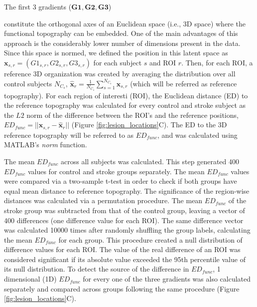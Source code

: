\documentclass[fleqn,10pt]{wlscirep}
\begin{document}
The first 3 gradients ($\textbf{G1},\textbf{G2},\textbf{G3}$) 
constitute the orthogonal axes of an Euclidean space (i.e., 3D space) where the functional topography can be embedded. One of the main advantages of this approach is the considerably lower number of dimensions present in the data. Since this space is normed, we defined the position in this latent space as $\textbf{x}_{s,r}=(G1_{s,r},G2_{s,r},G3_{s,r})$ for each subject $s$ and ROI $r$. Then, for each ROI, a reference 3D organization was created by averaging the distribution over all control subjects $N_{C_s}$, $\hat{\textbf{x}}_{r}=\frac{1}{N_{C_s}}\sum_{s=1 }^{N_{C_s}}\textbf{x}_{s,r}$ (which will be referred as reference topography). \color{red}For each region of interesti (ROI), \color{black} the Euclidean distance (ED) to the reference topography was calculated for every control and stroke subject as the $L2$ norm of the difference between the ROI's and the reference positions, $\textit{ED}_{{func}}=||\textbf{x}_{s,r}-\hat{\textbf{x}}_{r}||$ (Figure \ref{fig:lesion_locations}C). The ED to the 3D reference topography will be referred to as $\textit{ED}_{{func}}$, and was calculated using MATLAB's \emph{norm} function.

The mean $\textit{ED}_{{func}}$ across all subjects was calculated. This step generated 400 $\textit{ED}_{{func}}$ values for control and stroke groups separately. The mean $\textit{ED}_{{func}}$ values were compared via a two-sample t-test in order to check if both groups have equal mean distance to reference topography. The significance of the region-wise distances was calculated via a permutation procedure. The mean $\textit{ED}_{{func}}$ of the stroke group was subtracted from that of the control group, leaving a vector of 400 differences (one difference value for each ROI). The same difference vector was calculated 10000 times after randomly shuffling the group labels, calculating the mean   $\textit{ED}_{{func}}$ for each group. This procedure created a null distribution of difference values for each ROI. The value of the real difference of an ROI was considered significant if its absolute value exceeded the 95th percentile value of its null distribution. To detect the source of the difference in $\textit{ED}_{{func}}$, 1 dimensional (1D) $\textit{ED}_{func}$ for every one of the three gradients was also calculated separately and compared across groups following the same procedure (Figure \ref{fig:lesion_locations}C).
\end{document}
